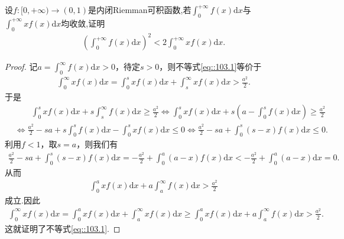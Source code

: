 \documentclass[../../main.tex]{subfiles}%
\begin{document}
\begin{example}
设$f:[0,+\infty)\to (0,1)$是内闭Riemman可积函数,若$\int_0^{+\infty} f(x) \mathrm{d}x$与$\int_0^{+\infty} x f(x) \mathrm{d}x$均收敛,证明
\begin{align}
\left( \int_0^{+\infty} f(x) \mathrm{d}x \right)^2 < 2 \int_0^{+\infty} x f(x) \mathrm{d}x.\label{eq::103.1}
\end{align}
\end{example}
\begin{proof}

记$a=\int_0^{\infty} f(x) \mathrm{d}x>0$，待定$s>0$，则不等式\eqref{eq::103.1}等价于
\begin{align*}
\int_0^{\infty} x f(x) \mathrm{d}x = \int_0^s x f(x) \mathrm{d}x + \int_s^{\infty} x f(x) \mathrm{d}x > \frac{a^2}{2}.
\end{align*}
于是
\begin{align*}
&\quad \quad \int_0^s x f(x) \mathrm{d}x + s \int_s^{\infty} f(x) \mathrm{d}x \geqslant \frac{a^2}{2} \Longleftrightarrow \int_0^s x f(x) \mathrm{d}x + s \left( a - \int_0^s f(x) \mathrm{d}x \right) \geqslant \frac{a^2}{2} \\
&\Longleftrightarrow \frac{a^2}{2} - sa + s \int_0^s f(x) \mathrm{d}x - \int_0^s x f(x) \mathrm{d}x \leqslant 0 \Longleftrightarrow \frac{a^2}{2} - sa + \int_0^s (s - x) f(x) \mathrm{d}x \leqslant 0.
\end{align*}
利用$f<1$，取$s=a$，则我们有
\begin{align*}
\frac{a^2}{2} - sa + \int_0^s (s - x) f(x) \mathrm{d}x = -\frac{a^2}{2} + \int_0^a (a - x) f(x) \mathrm{d}x < -\frac{a^2}{2} + \int_0^a (a - x) \mathrm{d}x = 0.
\end{align*}
从而
\begin{align*}
\int_0^a x f(x) \mathrm{d}x + a \int_a^{\infty} f(x) \mathrm{d}x > \frac{a^2}{2}
\end{align*}
成立.因此
\begin{align*}
\int_0^{\infty} x f(x) \mathrm{d}x = \int_0^a x f(x) \mathrm{d}x + \int_a^{\infty} x f(x) \mathrm{d}x \geqslant \int_0^a x f(x) \mathrm{d}x + a \int_a^{\infty} f(x) \mathrm{d}x > \frac{a^2}{2}.
\end{align*}
这就证明了不等式\eqref{eq::103.1}.

\end{proof}
\end{document}
